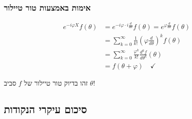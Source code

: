 \subsubsection{אימות באמצעות טור טיילור}

\begin{align*}
e^{-i\varphi X} f(\theta) &= e^{-i\varphi \cdot i\frac{d}{d\theta}} f(\theta) = e^{\varphi \frac{d}{d\theta}} f(\theta) \\
&= \sum_{k=0}^\infty \frac{1}{k!} \left(\varphi \frac{d}{d\theta}\right)^k f(\theta) \\
&= \sum_{k=0}^\infty \frac{\varphi^k}{k!} \frac{d^k f}{d\theta^k}(\theta) \\
&= f(\theta + \varphi) \quad \checkmark
\end{align*}

זהו בדיוק טור טיילור של $f$ סביב $\theta$!

\subsection{סיכום עיקרי הנקודות}

